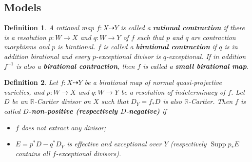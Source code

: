 \documentclass[11pt]{amsart}
\newtheorem{defn}{Definition}[section]
\begin{document}
\subsection{Models}
\begin{defn}
  \cite[\S 2]{haconSarkisovProgram2012} A rational map $f:X\dashrightarrow Y$ is called a \textbf{rational contraction} if there is a resolution $p:W\to X$  and $q:W\to Y$  of $f$  such that $p$  and $q$  are contraction morphisms and $p$  is birational. $f$ is called a \textbf{birational contraction} if $q$  is in addition birational and every $p$-exceptional divisor is $q$-exceptional. If in addition $f^{-1}$ is also a \textbf{birational contraction}, then $f$ is called a \textbf{small birational map}.
\end{defn}

\begin{defn}\label{negativemap}
  \cite[Definition 3.6.1]{BCHM10} Let $f:X\dashrightarrow Y$ be a birational map of normal quasi-projective varieties, and $p:W\to X$ and $q:W\to Y$ be a resolution of indeterminacy of $f$. Let $D$ be an $\mathbb{R}$-Cartier divisor on $X$ such that  $D_{Y}=f_*D$ is  also $\mathbb{R}$-Cartier. Then $f$ is called \textbf{$D$-non-positive (respectively $D$-negative)} if
\begin{itemize}
  \item $f$ does not extract any divisor;
  \item $E=p^{*}D-q^*D_Y$ is effective and exceptional over $Y$ (respectively $\operatorname{Supp}p_*E$ contains all $f$-exceptional divisors).
\end{itemize}
\end{defn}
\end{document}
